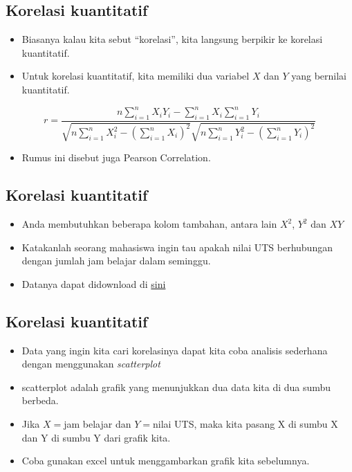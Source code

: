 \documentclass[
  letterpaper,
  DIV=11,
  numbers=noendperiod]{scrartcl}
\providecommand{\tightlist}{%
  \setlength{\itemsep}{0pt}\setlength{\parskip}{0pt}}\usepackage{longtable,booktabs,array}
\begin{document}
\hypertarget{korelasi-kuantitatif}{%
\subsection{Korelasi kuantitatif}\label{korelasi-kuantitatif}}

\begin{itemize}
\item
  Biasanya kalau kita sebut ``korelasi'', kita langsung berpikir ke
  korelasi kuantitatif.
\item
  Untuk korelasi kuantitatif, kita memiliki dua variabel \(X\) dan \(Y\)
  yang bernilai kuantitatif.
\end{itemize}

\[
r=\frac{n\sum_{i=1}^{n}X_iY_i-\sum_{i=1}^{n}X_i\sum_{i=1}^{n}Y_i}{\sqrt{n\sum_{i=1}^{n}X_i^2-\left(\sum_{i=1}^{n}X_i\right)^2} \sqrt{n\sum_{i=1}^{n}Y_i^2-\left(\sum_{i=1}^{n}Y_i\right)^2}}
\]

\begin{itemize}
\tightlist
\item
  Rumus ini disebut juga Pearson Correlation.
\end{itemize}

\hypertarget{korelasi-kuantitatif-1}{%
\subsection{Korelasi kuantitatif}\label{korelasi-kuantitatif-1}}

\begin{itemize}
\item
  Anda membutuhkan beberapa kolom tambahan, antara lain \(X^2\), \(Y^2\)
  dan \(XY\)
\item
  Katakanlah seorang mahasiswa ingin tau apakah nilai UTS berhubungan
  dengan jumlah jam belajar dalam seminggu.
\item
  Datanya dapat didownload di
  \href{https://docs.google.com/spreadsheets/d/16ZuQPD1sk76pv6sRpvjiiZcSP68CNPRq/edit?usp=drive_link\&ouid=117760147588370390523\&rtpof=true\&sd=true}{sini}
\end{itemize}

\hypertarget{korelasi-kuantitatif-2}{%
\subsection{Korelasi kuantitatif}\label{korelasi-kuantitatif-2}}

\begin{itemize}
\item
  Data yang ingin kita cari korelasinya dapat kita coba analisis
  sederhana dengan menggunakan \emph{scatterplot}
\item
  scatterplot adalah grafik yang menunjukkan dua data kita di dua sumbu
  berbeda.
\item
  Jika \(X=\)jam belajar dan \(Y=\)nilai UTS, maka kita pasang X di
  sumbu X dan Y di sumbu Y dari grafik kita.
\item
  Coba gunakan excel untuk menggambarkan grafik kita sebelumnya.
\end{itemize}
\end{document}
